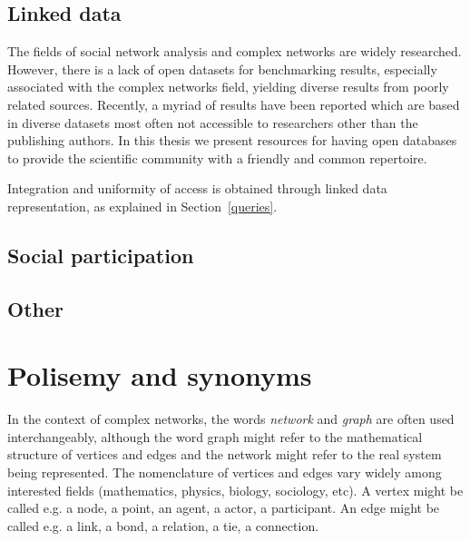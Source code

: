 \subsection{Linked data}
The fields of social network analysis and complex networks
are widely researched.
However, there is a lack of open datasets for benchmarking results,
especially associated with the complex networks field,
yielding diverse results from poorly related sources.
Recently, a myriad of results have been reported which are based in
diverse datasets most often not accessible to researchers other than the publishing authors.
In this thesis we present resources for having open databases to provide the scientific community with a friendly and common repertoire.

Integration and uniformity of access is obtained through linked data
representation, as explained in Section~\ref{queries}.

\subsection{Social participation}
\subsection{Other}

\section{Polisemy and synonyms}
In the context of complex networks, the words \emph{network} and \emph{graph}
are often used interchangeably, although the word graph might refer to the
mathematical structure of vertices and edges and the network might refer to the
real system being represented.
The nomenclature of vertices and edges vary widely among interested fields (mathematics, physics, biology, sociology, etc).
A vertex might be called e.g. a node, a point, an agent, a actor, a participant.
An edge might be called e.g. a link, a bond, a relation, a tie, a connection.


